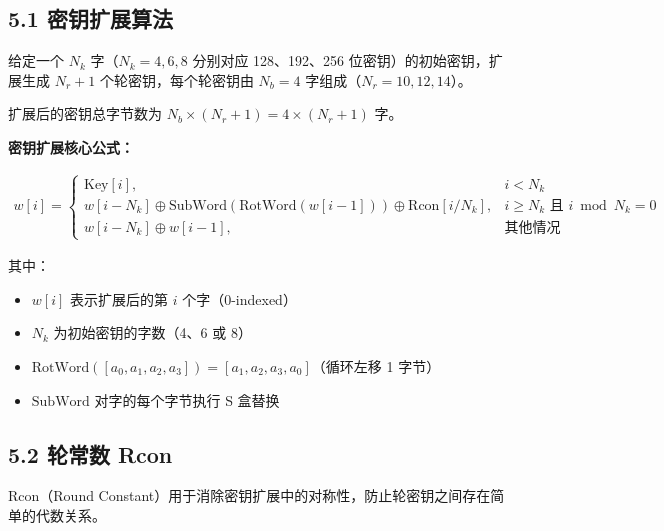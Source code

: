 \documentclass[12pt, a4paper]{article}
\begin{document}
\subsection{5.1 密钥扩展算法}

给定一个 $N_k$ 字（$N_k = 4, 6, 8$ 分别对应 128、192、256 位密钥）的初始密钥，扩展生成 $N_r + 1$ 个轮密钥，每个轮密钥由 $N_b = 4$ 字组成（$N_r = 10, 12, 14$）。

扩展后的密钥总字节数为 $N_b \times (N_r + 1) = 4 \times (N_r + 1)$ 字。

\begin{tcolorbox}[mathbox]
\textbf{密钥扩展核心公式：}
\end{tcolorbox}
\begin{align}
w[i] = 
\begin{cases}
\text{Key}[i], & i < N_k \\[4pt]
w[i-N_k] \oplus \text{SubWord}(\text{RotWord}(w[i-1])) \oplus \text{Rcon}[i/N_k], & i \geqslant N_k \text{ 且 } i \bmod N_k = 0 \\[6pt]
w[i-N_k] \oplus w[i-1], & \text{其他情况}
\end{cases}
\end{align}

其中：
\begin{itemize}
    \item $w[i]$ 表示扩展后的第 $i$ 个字（0-indexed）
    \item $N_k$ 为初始密钥的字数（4、6 或 8）
    \item $\text{RotWord}([a_0, a_1, a_2, a_3]) = [a_1, a_2, a_3, a_0]$（循环左移 1 字节）
    \item $\text{SubWord}$ 对字的每个字节执行 S 盒替换
\end{itemize}

\subsection{5.2 轮常数 Rcon}

Rcon（Round Constant）用于消除密钥扩展中的对称性，防止轮密钥之间存在简单的代数关系。
\end{document}
